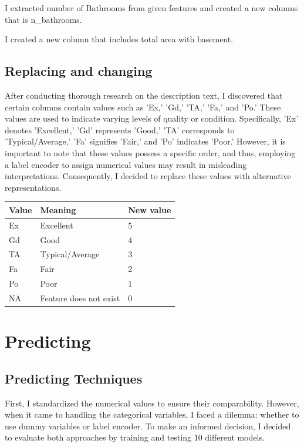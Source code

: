 I extracted number of Bathrooms from given features and created a new columns that is n\_bathrooms.

I created a new column that includes total area with basement.

\subsection{Replacing and changing}

After conducting thorough research on the description text, I discovered that certain columns contain values such as 'Ex,' 'Gd,' 'TA,' 'Fa,' and 'Po.' These values are used to indicate varying levels of quality or condition. Specifically, 'Ex' denotes 'Excellent,' 'Gd' represents 'Good,' 'TA' corresponds to 'Typical/Average,' 'Fa' signifies 'Fair,' and 'Po' indicates 'Poor.' However, it is important to note that these values possess a specific order, and thus, employing a label encoder to assign numerical values may result in misleading interpretations. Consequently, I decided to replace these values with alternative representations.
\begin{table}[!ht]
    \centering
    \begin{tabular}{|l|l|l|}
    \hline
        Value & Meaning & New value \\ \hline
        Ex & Excellent & 5 \\ \hline
        Gd & Good & 4 \\ \hline
        TA & Typical/Average & 3 \\ \hline
        Fa & Fair & 2 \\ \hline
        Po & Poor & 1 \\ \hline
        NA & Feature does not exist & 0 \\ \hline
    \end{tabular}
\end{table}
\newpage
\section{Predicting }
\subsection{Predicting Techniques}
First, I standardized the numerical values to ensure their comparability. However, when it came to handling the categorical variables, I faced a dilemma: whether to use dummy variables or label encoder. To make an informed decision, I decided to evaluate both approaches by training and testing 10 different models.

